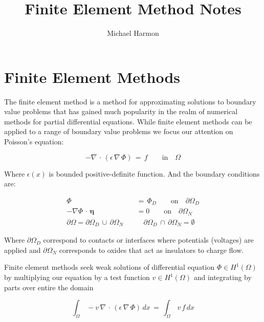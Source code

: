 \documentclass[10pt]{report}
\title{Finite Element Method Notes}
\author{Michael Harmon}
\numberwithin{equation}{section}
\begin{document}
\maketitle

\tableofcontents

\chapter{Finite Element Methods}


\noindent
The finite element method is a method for approximating solutions to
boundary value problems that has gained much popularity in the realm of 
numerical methods for partial differential equations.  While finite element methods can be applied to a range of boundary value problems we focus our attention on Poisson's equation:

\begin{equation}\label{eq:Poisson}
-\nabla \, \cdot \, \left(\epsilon \, \nabla \, \Phi \right) \, = \, f \qquad \text{in} \quad \Omega
\end{equation}


\noindent
Where $\epsilon(x)$ is bounded positive-definite function. And the boundary conditions are:


\begin{align}
\Phi \, &= \, \Phi_{D} \qquad \text{on} \quad \partial \Omega_{D} \label{eq:DirichletBC} \\
-\nabla \Phi \, \cdot \, \boldsymbol \eta  &= 0 \qquad \text{on} \quad \partial \Omega_{N} \label{eq:NeumannBC} \\
 \partial \Omega = \partial \Omega_{D} \, \cup \, \partial \Omega_{N} \quad & \quad \partial \Omega_{D} \, \cap \, \partial \Omega_{N} = \emptyset
\end{align}


\noindent
Where $\partial \Omega_{D}$ correspond to contacts or interfaces where potentials (voltages) are applied and $\partial \Omega_{N}$ corresponds to oxides that act as insulators to charge flow.



\vspace{2mm}


\noindent
Finite element methods seek weak solutions of differential equation $\Phi \in H^{1}(\Omega)$ by multiplying our equation by a test function $v \in H^{1}(\Omega)$ and integrating by parts over entire the domain

$$ \int_{\Omega} \, - v \, \nabla  \, \cdot \, \left(\epsilon \, \nabla \, \Phi \right) \, dx \, =  \, \int_{\Omega} \, v \, f \, dx $$
\end{document}
